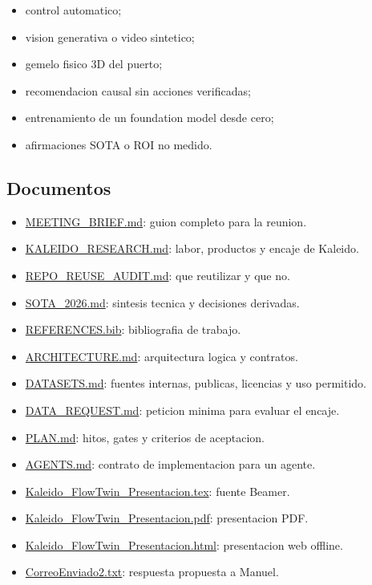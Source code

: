 \documentclass[
  spanish,
  10pt,
  a4paper,
]{article}
\providecommand{\tightlist}{%
  \setlength{\itemsep}{0pt}\setlength{\parskip}{0pt}}
\begin{document}
\begin{itemize}
\tightlist
\item
  control automatico;
\item
  vision generativa o video sintetico;
\item
  gemelo fisico 3D del puerto;
\item
  recomendacion causal sin acciones verificadas;
\item
  entrenamiento de un foundation model desde cero;
\item
  afirmaciones SOTA o ROI no medido.
\end{itemize}

\subsection{Documentos}\label{documentos}

\begin{itemize}
\tightlist
\item
  \href{docs/MEETING_BRIEF.md}{MEETING\_BRIEF.md}: guion completo para
  la reunion.
\item
  \href{docs/investigacion/KALEIDO_RESEARCH.md}{KALEIDO\_RESEARCH.md}:
  labor, productos y encaje de Kaleido.
\item
  \href{docs/investigacion/REPO_REUSE_AUDIT.md}{REPO\_REUSE\_AUDIT.md}:
  que reutilizar y que no.
\item
  \href{docs/investigacion/SOTA_2026.md}{SOTA\_2026.md}: sintesis
  tecnica y decisiones derivadas.
\item
  \href{docs/investigacion/REFERENCES.bib}{REFERENCES.bib}: bibliografia
  de trabajo.
\item
  \url{ARCHITECTURE.md}: arquitectura logica y contratos.
\item
  \url{DATASETS.md}: fuentes internas, publicas, licencias y uso
  permitido.
\item
  \url{DATA_REQUEST.md}: peticion minima para evaluar el encaje.
\item
  \url{PLAN.md}: hitos, gates y criterios de aceptacion.
\item
  \url{AGENTS.md}: contrato de implementacion para un agente.
\item
  \href{presentacion/Kaleido_FlowTwin_Presentacion.tex}{Kaleido\_FlowTwin\_Presentacion.tex}:
  fuente Beamer.
\item
  \href{presentacion/Kaleido_FlowTwin_Presentacion.pdf}{Kaleido\_FlowTwin\_Presentacion.pdf}:
  presentacion PDF.
\item
  \href{presentacion/Kaleido_FlowTwin_Presentacion.html}{Kaleido\_FlowTwin\_Presentacion.html}:
  presentacion web offline.
\item
  \href{correspondencia/CorreoEnviado2.txt}{CorreoEnviado2.txt}:
  respuesta propuesta a Manuel.
\end{itemize}
\end{document}
